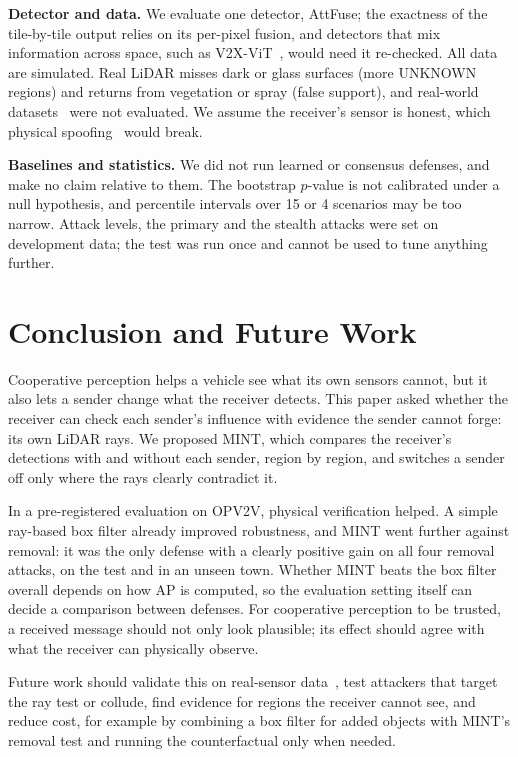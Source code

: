 \documentclass[conference]{IEEEtran}
\newcommand{\mint}{MINT}
\begin{document}
\textbf{Detector and data.} We evaluate one detector, AttFuse; the exactness of the tile-by-tile output relies on
its per-pixel fusion, and detectors that mix information across space, such as V2X-ViT~\cite{xu2022v2xvit}, would
need it re-checked. All data are simulated. Real LiDAR misses dark or glass surfaces (more UNKNOWN regions) and
returns from vegetation or spray (false support), and real-world datasets~\cite{xu2023v2v4real,luo2025mixedsignals}
were not evaluated. We assume the receiver's sensor is honest, which physical spoofing~\cite{cao2019advlidar}
would break.

\textbf{Baselines and statistics.} We did not run learned or consensus defenses, and make no claim relative to
them. The bootstrap $p$-value is not calibrated under a null hypothesis, and percentile intervals over 15 or 4
scenarios may be too narrow. Attack levels, the primary and the stealth attacks were set on development data; the
test was run once and cannot be used to tune anything further.

\section{Conclusion and Future Work}
\label{sec:conclusion}
Cooperative perception helps a vehicle see what its own sensors cannot, but it also lets a sender change what the
receiver detects. This paper asked whether the receiver can check each sender's influence with evidence the
sender cannot forge: its own LiDAR rays. We proposed \mint, which compares the receiver's detections with and
without each sender, region by region, and switches a sender off only where the rays clearly contradict it.

In a pre-registered evaluation on OPV2V, physical verification helped. A simple ray-based box filter already
improved robustness, and \mint{} went further against removal: it was the only defense with a clearly positive
gain on all four removal attacks, on the test and in an unseen town. Whether \mint{} beats the box filter overall
depends on how AP is computed, so the evaluation setting itself can decide a comparison between defenses. For
cooperative perception to be trusted, a received message should not only look plausible; its effect should agree
with what the receiver can physically observe.

Future work should validate this on real-sensor data~\cite{xu2023v2v4real,luo2025mixedsignals}, test attackers
that target the ray test or collude, find evidence for regions the receiver cannot see, and reduce cost, for
example by combining a box filter for added objects with \mint's removal test and running the counterfactual only
when needed.
\end{document}
